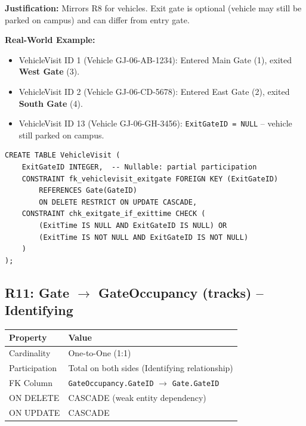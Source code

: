 \documentclass[a4paper, 12pt]{article}
\begin{document}
\textbf{Justification:} Mirrors R8 for vehicles. Exit gate is optional (vehicle may still be parked on campus) and can differ from entry gate.

\textbf{Real-World Example:}
\begin{itemize}[leftmargin=*, nosep]
    \item VehicleVisit ID 1 (Vehicle GJ-06-AB-1234): Entered Main Gate (1), exited \textbf{West Gate} (3).
    \item VehicleVisit ID 2 (Vehicle GJ-06-CD-5678): Entered East Gate (2), exited \textbf{South Gate} (4).
    \item VehicleVisit ID 13 (Vehicle GJ-06-GH-3456): \texttt{ExitGateID = NULL} -- vehicle still parked on campus.
\end{itemize}

\begin{lstlisting}[style=sqlstyle, caption={R10 Implementation}, label={lst:r10}]
CREATE TABLE VehicleVisit (
    ExitGateID INTEGER,  -- Nullable: partial participation
    CONSTRAINT fk_vehiclevisit_exitgate FOREIGN KEY (ExitGateID)
        REFERENCES Gate(GateID)
        ON DELETE RESTRICT ON UPDATE CASCADE,
    CONSTRAINT chk_exitgate_if_exittime CHECK (
        (ExitTime IS NULL AND ExitGateID IS NULL) OR
        (ExitTime IS NOT NULL AND ExitGateID IS NOT NULL)
    )
);
\end{lstlisting}

\subsection{R11: Gate \texorpdfstring{$\rightarrow$}{->} GateOccupancy (tracks) -- Identifying}

\begin{table}[H]
\centering
\small
\begin{tabularx}{\textwidth}{l X}
\toprule
\textbf{Property} & \textbf{Value} \\
\midrule
Cardinality & One-to-One (1:1) \\
Participation & Total on both sides (Identifying relationship) \\
FK Column & \texttt{GateOccupancy.GateID} $\rightarrow$ \texttt{Gate.GateID} \\
ON DELETE & CASCADE (weak entity dependency) \\
ON UPDATE & CASCADE \\
\bottomrule
\end{tabularx}
\end{table}
\end{document}
